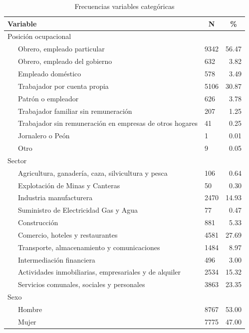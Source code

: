 \documentclass[
  11pt,
  letterpaper,
]{article}
\begin{document}
\begin{table}[H]

\begin{center}
\begin{threeparttable}

\caption{\label{tab:descriptive_categorical}Frecuencias variables categóricas}

\begin{tabular}{llr}
\toprule
Variable & \multicolumn{1}{c}{N} & \multicolumn{1}{c}{\%}\\
\midrule
Posición ocupacional &  & \\
\ \ \ Obrero, empleado particular & 9342 & 56.47\\
\ \ \ Obrero, empleado del gobierno & 632 & 3.82\\
\ \ \ Empleado doméstico & 578 & 3.49\\
\ \ \ Trabajador por cuenta propia & 5106 & 30.87\\
\ \ \ Patrón o empleador & 626 & 3.78\\
\ \ \ Trabajador familiar sin remuneración & 207 & 1.25\\
\ \ \ Trabajador sin remuneración en empresas de otros hogares & 41 & 0.25\\
\ \ \ Jornalero o Peón & 1 & 0.01\\
\ \ \ Otro & 9 & 0.05\\
Sector &  & \\
\ \ \ Agricultura, ganadería, caza, silvicultura y pesca & 106 & 0.64\\
\ \ \ Explotación de Minas y Canteras & 50 & 0.30\\
\ \ \ Industria manufacturera & 2470 & 14.93\\
\ \ \ Suministro de Electricidad Gas y Agua & 77 & 0.47\\
\ \ \ Construcción & 881 & 5.33\\
\ \ \ Comercio, hoteles y restaurantes & 4581 & 27.69\\
\ \ \ Transporte, almacenamiento y comunicaciones & 1484 & 8.97\\
\ \ \ Intermediación financiera & 496 & 3.00\\
\ \ \ Actividades inmobiliarias, empresariales y de alquiler & 2534 & 15.32\\
\ \ \ Servicios comunales, sociales y personales & 3863 & 23.35\\
Sexo &  & \\
\ \ \ Hombre & 8767 & 53.00\\
\ \ \ Mujer & 7775 & 47.00\\
\bottomrule
\end{tabular}

\end{threeparttable}
\end{center}

\end{table}
\end{document}
